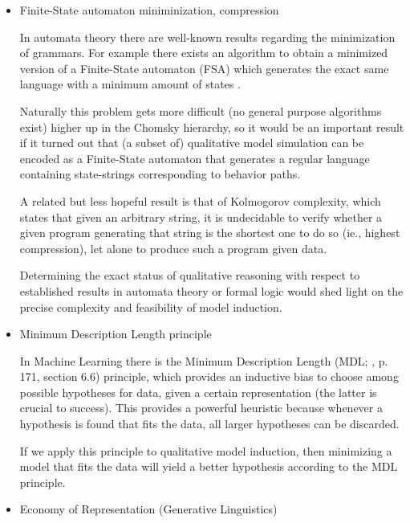 \documentclass{article} %
\begin{document}
\begin{itemize}


\item Finite-State automaton miniminization, compression

	In automata theory there are well-known results regarding the
	minimization of grammars. For example there exists an algorithm to
	obtain a minimized version of a Finite-State automaton (FSA) which
	generates the exact same language with a minimum amount of states
	\cite{hopcroft}.

	Naturally this problem gets more difficult (no general purpose
	algorithms exist) higher up in the Chomsky hierarchy, so it would be
	an important result if it turned out that (a subset of) qualitative
	model simulation can be encoded as a Finite-State automaton that
	generates a regular language containing state-strings corresponding to
	behavior paths.

	A related but less hopeful result is that of Kolmogorov complexity,
	which states that given an arbitrary string, it is undecidable to
	verify whether a given program generating that string is the shortest
	one to do so (ie., highest compression), let alone to produce such a
	program given data.

	Determining the exact status of qualitative reasoning with respect to
	established results in automata theory or formal logic would shed light
	on the precise complexity and feasibility of model induction.

\item Minimum Description Length principle 

	In Machine Learning there is the Minimum Description Length (MDL;
	\cite{mitchell}, p. 171, section 6.6)
	principle, which provides an inductive bias to choose among possible
	hypotheses for data, given a certain representation (the latter is
	crucial to success).  This provides a powerful heuristic because
	whenever a hypothesis is found that fits the data, all larger
	hypotheses can be discarded.
	
	If we apply this principle to qualitative model induction, then
	minimizing a model that fits the data will yield a better hypothesis
	according to the MDL principle.

\item Economy of Representation (Generative Linguistics)


\end{itemize}
\end{document}
